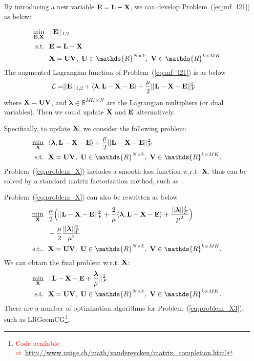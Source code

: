 \documentclass[letterpaper]{article}
\def\bE{{\bf E}}
\def\blambda{{\bm \lambda}}
\def\calL{{\mathcal{L}}}
\def\bL{{\bf L}}
\def\bU{{\bf U}}
\def\bV{{\bf V}}
\def\dsR{\mathds{R}}
\def\bX{{\bf X}}
\def\bX{{\bf X}}
\def\st{{\text{s.t.}}}
\def\yanred{\textcolor{red}}
\begin{document}
By introducing a new variable $\bE = \bL - \bX$, we can develop Problem~(\ref{eq:mf_l21}) as below:

\begin{align}\label{eq:mf_l21_constrained}
  \min_{\bE, \bX} ~&~ || \bE ||_{1,2}   \nonumber \\
  \st             ~&~ \bE = \bL - \bX   \nonumber \\
                  ~&~ \bX = \bU \bV,~\bU \in \dsR^{N \times k},~\bV \in \dsR^{k \times MK}
\end{align}
The augmented Lagrangian function of Problem~(\ref{eq:mf_l21}) is as below
\begin{align}\label{eq:lagrangian_l21}
  \calL = & || \bE ||_{1,2} + \langle \blambda, \bL - \bX - \bE \rangle + \frac{\mu}{2} || \bL - \bX - \bE ||_F^2
\end{align}
\noindent
where $\bX = \bU \bV$,
and $\blambda \in \dsR^{MK \times N}$ are the Lagrangian multipliers (or dual variables).
Then we could update $\bX$ and $\bE$ alternatively.


Specifically, to update $\bX$, we consider the following problem:
\begin{align}\label{eq:problem_X}
  \min_{\bX} ~&~ \langle \blambda, \bL - \bX - \bE \rangle + \frac{\mu}{2} || \bL - \bX - \bE ||_F^2  \nonumber  \\
  \st        ~&~ \bX = \bU \bV,~\bU \in \dsR^{N \times k},~\bV \in \dsR^{k \times MK}   .
\end{align}
Problem~(\ref{eq:problem_X}) includes a smooth loss function w.r.t. $\bX$, thus can be solved by a standard matrix factorization method, such as~\cite{yanijcai2015scalable,tanicml2014riemannian,vandereyckensiamjo2013low}.


Problem~(\ref{eq:problem_X}) can also be rewritten as below
\begin{align}\label{eq:problem_X2}
  \min_{\bX} ~&~ \frac{\mu}{2} \Big( || \bL - \bX - \bE ||_F^2 + \frac{2}{\mu} \langle \blambda, \bL - \bX - \bE \rangle + \frac{|| \blambda ||_F^2}{\mu^2} \Big)    \nonumber   \\
             ~&~ - \frac{\mu}{2} \frac{|| \blambda ||_F^2}{\mu^2}   \nonumber \\
  \st.       ~&~ \bX = \bU \bV,~\bU \in \dsR^{N \times k},~\bV \in \dsR^{k \times MK}   .
\end{align}
\noindent
We can obtain the final problem w.r.t. $\bX$:
\begin{align}\label{eq:problem_X3}
  \min_{\bX} ~&~ || \bL - \bX - \bE + \frac{\blambda}{\mu} ||_F^2   \nonumber \\
  \st        ~&~ \bX = \bU \bV,~\bU \in \dsR^{N \times k},~\bV \in \dsR^{k \times MK}   .
\end{align}
\noindent
There are a number of optimization algorithms for Problem~(\ref{eq:problem_X3}), such as LRGeomCG\footnote{\yanred{Code available at~\url{http://www.unige.ch/math/vandereycken/matrix_completion.html}}}.
\end{document}
